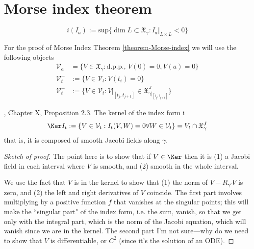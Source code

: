 \documentclass{book}
\begin{document}
\section{Morse index theorem}
\label{section-morse-index}

\begin{definition}
\label{definition-index-index-form}
$$
i(I_a):=\text{sup}\{\dim L \subset
\mathfrak{X}_\gamma:I_a |_{L \times L}<0\}
$$
\end{definition}

For the proof of Morse Index Theorem
\ref{theorem-Morse-index} we will use the
following objects
\begin{equation}
\label{equation-index-theorem-spaces}
\begin{aligned}
\mathcal{V}_a&=\{V \in
\mathfrak{X}_\gamma:\text{d.p.p., }V(0)=0,
V(a)=0\}\\
\mathcal{V}_t^+&:=\{V \in
\mathcal{V}_t:V(t_i)=0\}\\
\mathcal{V}_t^-& :=\{V \in
\mathcal{V}_t:V|_{[t_j,t_{j+1}]}\in
\mathfrak{X}_{\gamma|_{[t_j,t_{j+1}]}}^J\}
\end{aligned}
\end{equation}

\begin{proposition}
\label{proposition-kernel-of-index-form}
\cite{doc}, Chapter X, Proposition 2.3. The
kernel of the index form i
$$
\Ker I_t:=\{V \in
\mathcal{V}_t:I_t(V,W)=0\forall
W\in\mathcal{V}_t\}=
V_t \cap \mathfrak{X}_\gamma^J
$$
that is, it is composed of smooth Jacobi
fields along $\gamma$.
\end{proposition}

\begin{proof}[Sketch of proof]
The point here is to show that if $V \in
\Ker$ then it is (1) a Jacobi
 field in each interval where $V$ is smooth,
 and (2) smooth in the whole
 interval.

We use the fact that $V$ is in the kernel to
show that (1) the norm of
$V-R_{\gamma'}V$ is zero, and (2) the left
and right derivatives of $V$
coincide. The first part involves multiplying
by a positive function $f$ that
vanishes at the singular points; this will
make the ``singular part" of the
index form, i.e. the sum, vanish, so that we
get only with the integral part,
which is the norm of the Jacobi equation,
which will vanish since we are in the
kernel. The second part I'm not sure---why do
we need to show that $V$ is
differentiable, or $C^2$ (since it's the
solution of an ODE).
\end{proof}
\end{document}
